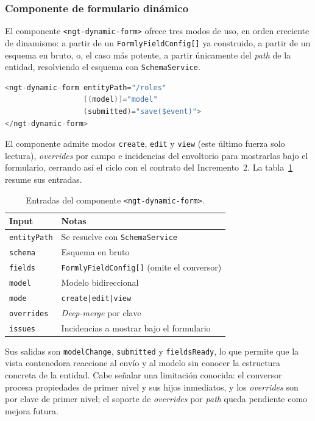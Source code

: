 \subsubsection{Componente de formulario dinámico}
El componente \texttt{<ngt-dynamic-form>} ofrece tres modos de uso, en orden
creciente de dinamismo: a partir de un \texttt{FormlyFieldConfig[]} ya
construido, a partir de un esquema en bruto, o, el caso más potente, a
partir únicamente del \emph{path} de la entidad, resolviendo el esquema con
\texttt{SchemaService}.

\begin{lstlisting}[language=Java, caption={Formulario generado solo a partir del path de la entidad}, label={lst:dynform}]
<ngt-dynamic-form entityPath="/roles"
                  [(model)]="model"
                  (submitted)="save($event)">
</ngt-dynamic-form>
\end{lstlisting}

El componente admite modos \texttt{create}, \texttt{edit} y \texttt{view}
(este último fuerza solo lectura), \emph{overrides} por campo e
incidencias del envoltorio para mostrarlas bajo el formulario, cerrando así el
ciclo con el contrato del Incremento~2. La tabla~\ref{tab:dfinputs} resume sus
entradas.

\begin{table}[!htbp]
\caption{Entradas del componente \texttt{<ngt-dynamic-form>}.}
\label{tab:dfinputs}
\centering
\begin{tabular}{|l|p{7cm}|}
\hline
\textbf{Input} & \textbf{Notas} \\ \hline
\texttt{entityPath} & Se resuelve con \texttt{SchemaService} \\ \hline
\texttt{schema} & Esquema en bruto \\ \hline
\texttt{fields} & \texttt{FormlyFieldConfig[]} (omite el conversor) \\ \hline
\texttt{model} & Modelo bidireccional \\ \hline
\texttt{mode} & \texttt{create|edit|view} \\ \hline
\texttt{overrides} & \emph{Deep-merge} por clave \\ \hline
\texttt{issues} & Incidencias a mostrar bajo el formulario \\ \hline
\end{tabular}
\end{table}

Sus salidas son \texttt{modelChange}, \texttt{submitted} y
\texttt{fieldsReady}, lo que permite que la vista contenedora reaccione al
envío y al modelo sin conocer la estructura concreta de la entidad. Cabe
señalar una limitación conocida: el conversor procesa
propiedades de primer nivel y sus hijos inmediatos, y los \emph{overrides} son
por clave de primer nivel; el soporte de \emph{overrides} por \emph{path}
queda pendiente como mejora futura.

